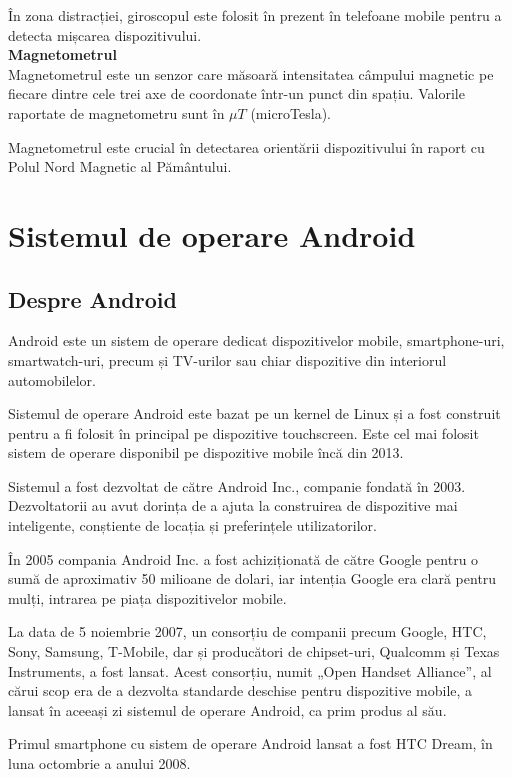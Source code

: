 \documentclass[12pt,a4paper]{article}
\begin{document}
În zona distracției, giroscopul este folosit în prezent în telefoane mobile pentru a detecta mișcarea dispozitivului.\\

\textbf{Magnetometrul}\\
Magnetometrul este un senzor care măsoară intensitatea câmpului magnetic  pe fiecare dintre cele trei axe de coordonate într-un punct din spațiu. Valorile raportate de magnetometru sunt în $\mu T$ (microTesla).

Magnetometrul este crucial în detectarea orientării dispozitivului în raport cu Polul Nord Magnetic al Pământului.

\newpage
\section{Sistemul de operare Android} \label{DetaliiAndroidOS}
\subsection{Despre Android \cite{AndroidHistoryAndroidCentral}} 
Android este un sistem de operare dedicat dispozitivelor mobile, smartphone-uri, smartwatch-uri, precum și TV-urilor sau chiar dispozitive din interiorul automobilelor.

Sistemul de operare Android este bazat pe un kernel de Linux și a fost construit pentru a fi folosit în principal pe dispozitive touchscreen. Este cel mai folosit sistem de operare disponibil pe dispozitive mobile încă din 2013.

Sistemul a fost dezvoltat de către Android Inc., companie fondată în 2003. Dezvoltatorii au avut dorința de a ajuta la construirea de dispozitive mai inteligente, conștiente de locația și preferințele utilizatorilor.

În 2005 compania Android Inc. a fost achiziționată de către Google pentru o sumă de aproximativ 50 milioane de dolari, iar intenția Google era clară pentru mulți, intrarea pe piața dispozitivelor mobile.

La data de 5 noiembrie 2007, un consorțiu de companii precum Google, HTC, Sony, Samsung, T-Mobile, dar și producători de chipset-uri, Qualcomm și Texas Instruments, a fost lansat. Acest consorțiu, numit „Open Handset Alliance”, al cărui scop era de a dezvolta standarde deschise pentru dispozitive mobile, a lansat în aceeași zi sistemul de operare Android, ca prim produs al său.

Primul smartphone cu sistem de operare Android lansat a fost HTC Dream, în luna octombrie a anului 2008.
\end{document}
